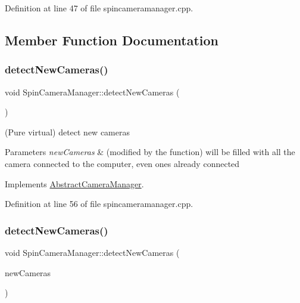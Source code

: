 Definition at line 47 of file spincameramanager.\+cpp.



\subsection{Member Function Documentation}
\mbox{\label{class_spin_camera_manager_affc9edfd215e7dd1ad050cd111906863}} 
\subsubsection{\texorpdfstring{detectNewCameras()}{detectNewCameras()}\hspace{0.1cm}{\footnotesize\ttfamily [1/2]}}
{\footnotesize\ttfamily void Spin\+Camera\+Manager\+::detect\+New\+Cameras (\begin{DoxyParamCaption}{ }\end{DoxyParamCaption})\hspace{0.3cm}{\ttfamily [virtual]}}



(Pure virtual) detect new cameras 


\begin{DoxyParams}{Parameters}
{\em new\+Cameras} & (modified by the function) will be filled with all the camera connected to the computer, even ones already connected \\
\hline
\end{DoxyParams}


Implements \mbox{\hyperlink{class_abstract_camera_manager_a5285c2cf6e1976d0c22e46f01efdef51}{Abstract\+Camera\+Manager}}.



Definition at line 56 of file spincameramanager.\+cpp.

\mbox{\label{class_spin_camera_manager_a6586a44c68b7e37a0992819af7711cc7}} 
\subsubsection{\texorpdfstring{detectNewCameras()}{detectNewCameras()}\hspace{0.1cm}{\footnotesize\ttfamily [2/2]}}
{\footnotesize\ttfamily void Spin\+Camera\+Manager\+::detect\+New\+Cameras (\begin{DoxyParamCaption}\item[{std\+::vector$<$ \mbox{\hyperlink{class_abstract_camera}{Abstract\+Camera}} $\ast$ $>$ $\ast$}]{new\+Cameras }\end{DoxyParamCaption})\hspace{0.3cm}{\ttfamily [virtual]}}




